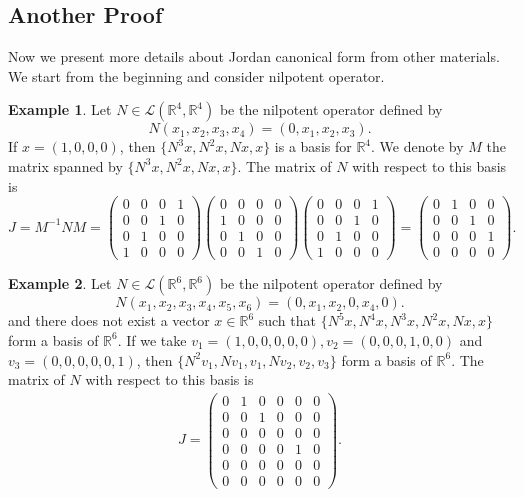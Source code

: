 \documentclass[11pt]{book}
\theoremstyle{definition}
\newtheorem{example}{Example}[section]
\numberwithin{equation}{subsection}
\begin{document}
\subsection{Another Proof}
Now we present more details about Jordan canonical form from other materials\cite{8}. We start from the beginning and consider nilpotent operator.
\begin{example}
Let $N\in\mathcal{L}(\mathbb{R}^4,\mathbb{R}^4)$ be the nilpotent operator defined by
$$N(x_1,x_2,x_3,x_4) = (0,x_1,x_2,x_3).$$
If $x = (1,0,0,0)$, then $\{N^3x, N^2x, Nx,x\}$ is a basis for $\mathbb{R}^4$. We denote by $M$ the matrix spanned by $\{N^3x, N^2x, Nx,x\}$. The matrix of $N$ with respect to this basis is 
$$
J = M^{-1}NM = \begin{pmatrix}
    0 & 0 & 0 & 1 \\
    0 & 0 & 1 & 0\\
    0 & 1 & 0 & 0 \\
    1 & 0 & 0 & 0
\end{pmatrix}\begin{pmatrix}
    0 & 0 & 0 & 0 \\
    1 & 0 & 0 & 0\\
    0 & 1 & 0 & 0 \\
    0 & 0 & 1 & 0
\end{pmatrix} \begin{pmatrix}
    0 & 0 & 0 & 1 \\
    0 & 0 & 1 & 0\\
    0 & 1 & 0 & 0 \\
    1 & 0 & 0 & 0
\end{pmatrix} =  \begin{pmatrix}
    0 & 1 & 0 & 0 \\
    0 & 0 & 1 & 0\\
    0 & 0 & 0 & 1 \\
    0 & 0 & 0 & 0
\end{pmatrix}.
$$
\end{example}

\medskip

\begin{example}
Let $N\in\mathcal{L}(\mathbb{R}^6,\mathbb{R}^6)$ be the nilpotent operator defined by
$$N(x_1,x_2,x_3,x_4,x_5,x_6) = (0,x_1,x_2,0,x_4,0).$$
and there does not exist a vector $x\in\mathbb{R}^6$ such that $\{N^5x, N^4x, N^3x, N^2x, Nx, x\}$ form a basis of $\mathbb{R}^6$. If we take $v_1 = (1,0,0,0,0,0), v_2 = (0,0,0,1,0,0)$ and $v_3 = (0,0,0,0,0,1)$, then $\{N^2v_1, Nv_1, v_1, Nv_2, v_2, v_3\}$ form a basis of $\mathbb{R}^6$. The matrix of $N$ with respect to this basis is 
\begin{align*}
    J = \begin{pmatrix}
    0 & 1 & 0 & 0 & 0 & 0 \\
    0 & 0 & 1 & 0 & 0 & 0 \\
    0 & 0 & 0 & 0 & 0 & 0 \\
    0 & 0 & 0 & 0 & 1 & 0 \\
    0 & 0 & 0 & 0 & 0 & 0 \\
    0 & 0 & 0 & 0 & 0 & 0
\end{pmatrix}.
\end{align*}
\end{example}
\end{document}
